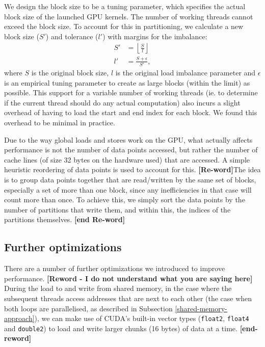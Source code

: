 We design the block size to be a tuning parameter, which specifies the actual
block size of the launched GPU kernels. The number of working threads
cannot exceed the block size. To account for this in partitioning, we calculate 
a new block size ($S'$) and tolerance ($l'$) with margins for the imbalance:
\begin{align}
  S' &= \left\lfloor \frac{S}{l} \right\rfloor \\
  l' &= \frac{S + \epsilon}{S'},
\end{align}
where $S$ is the original block size, $l$ is the original load imbalance
parameter and $\epsilon$ is an empirical tuning parameter to create as large
blocks (within the limit) as possible. This support for a variable number of 
working threads (ie. to determine if the current thread should do any actual 
computation) also incurs a slight overhead of having to load the start and end 
index for each block. We found this overhead to be minimal in practice.

Due to the way global loads and stores work on the GPU, what actually affects
performance is not the number of data points accessed, but rather the number of
cache lines (of size 32 bytes on the hardware used) that are accessed. A simple 
heuristic reordering of data points is used to account for this. 
\textbf{[Re-word]}The idea is to group data points together that are 
read/written by the same set of blocks, especially a set of more than one block, 
since any inefficiencies in that case will count more than once. To achieve 
this, we simply sort the data points by the number of partitions that write 
them, and within this, the indices of the partitions themselves. 
\textbf{[end Re-word]}

\subsection{Further optimizations}\label{optimisations}

\noindent There are a number of further optimizations we introduced to improve 
performance. \textbf{[Reword - I do not understand what you are saying here]}
During the load to and write from shared memory, in the case where 
the subsequent threads access addresses that are next to each other (the case 
when both loops are parallelised, as described in Subsection
\ref{shared-memory-approach}), we can make use of CUDA's built-in vector
types (\lstinline!float2!, \lstinline!float4! and \lstinline!double2!) to load
and write larger chunks (16 bytes) of data at a time. \textbf{[end-reword]}

